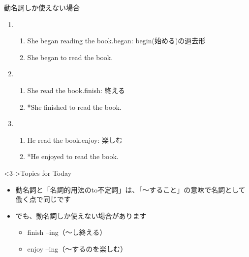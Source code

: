 \documentclass[aspectratio=169,xcolor={dvipsnames,table}]{beamer}
\begin{document}
\begin{frame}[plain]{動名詞しか使えない場合}

 \begin{enumerate}
  \item \begin{enumerate}
	 \item<1-> She began reading the book.\hfill{\scriptsize began: begin(始める)の過去形}
	 \item<2-> She began to read the book.
	\end{enumerate}
  \item \begin{enumerate}
	 \item<4-> She  read the book.\hfill{\scriptsize finish: 終える}
	 \item<5-> *She finished to read the book.
	\end{enumerate}
  \item \begin{enumerate}
	 \item<7-> He  read the book.\hfill{\scriptsize enjoy: 楽しむ}
	 \item<8-> *He enjoyed to read the book.
	\end{enumerate}
 \end{enumerate}

\begin{exampleblock}<3->{Topics for Today}
\begin{itemize}\small
 \item<3->  動名詞と「名詞的用法のto不定詞」は、「〜すること」の意味で名詞として働く点で同じです
 \item<6-> でも、動名詞しか使えない場合があります \dbend
       \begin{itemize}
	\item<6-> finish --ing（〜し終える）\hfill{}\hspace{80pt}\mbox{}
	\item<9-> enjoy --ing（〜するのを楽しむ）\hfill{}\hspace{80pt}\mbox{}
       \end{itemize}
 \end{itemize}
     \end{exampleblock}
\end{frame}
\end{document}
